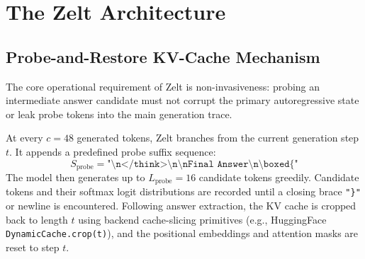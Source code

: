 \documentclass[11pt]{article}
\begin{document}
\section{The Zelt Architecture}
\label{sec:method}

\subsection{Probe-and-Restore KV-Cache Mechanism}
The core operational requirement of Zelt is non-invasiveness: probing an intermediate answer candidate must not corrupt the primary autoregressive state or leak probe tokens into the main generation trace.

At every $c=48$ generated tokens, Zelt branches from the current generation step $t$. It appends a predefined probe suffix sequence:
\[
  S_{\mathrm{probe}} = \texttt{"\textbackslash n</think>\textbackslash n\textbackslash nFinal Answer\textbackslash n\textbackslash boxed\{"}
\]
The model then generates up to $L_{\mathrm{probe}}=16$ candidate tokens greedily. Candidate tokens and their softmax logit distributions are recorded until a closing brace \texttt{"\}"} or newline is encountered. Following answer extraction, the KV cache is cropped back to length $t$ using backend cache-slicing primitives (e.g., HuggingFace \texttt{DynamicCache.crop(t)}), and the positional embeddings and attention masks are reset to step $t$.
\end{document}
